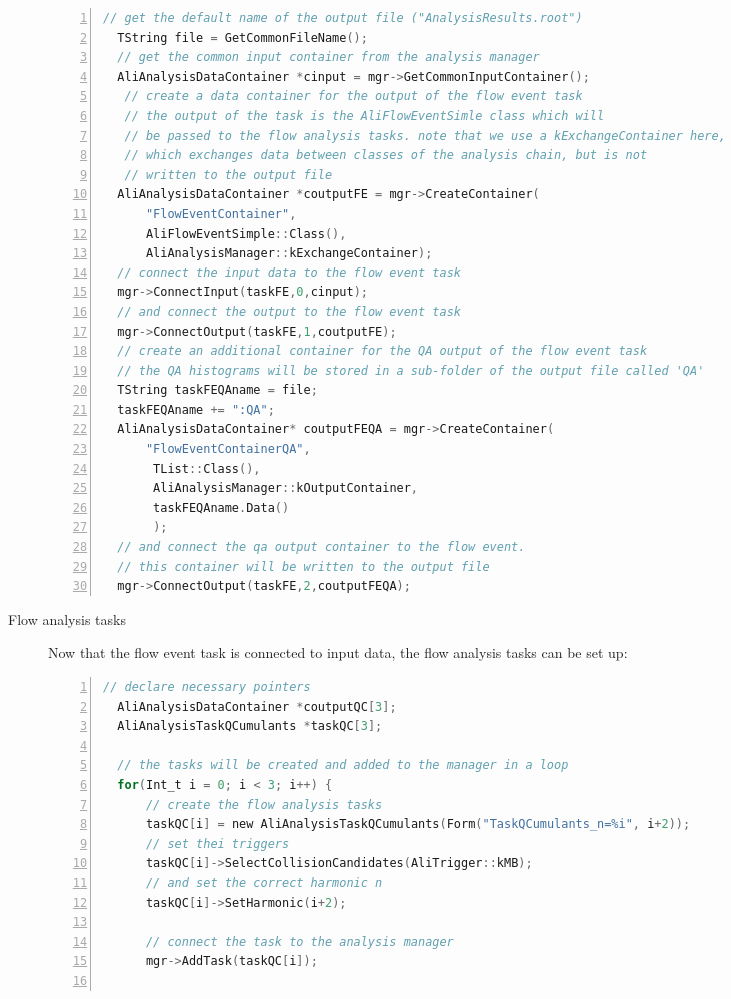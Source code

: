 \documentclass[a4paper]{book}
\numberwithin{equation}{subsection}
\begin{document}
\begin{description}
\begin{lstlisting}[language=C, numbers=left]
  // get the default name of the output file ("AnalysisResults.root")
  TString file = GetCommonFileName();
  // get the common input container from the analysis manager
  AliAnalysisDataContainer *cinput = mgr->GetCommonInputContainer();
   // create a data container for the output of the flow event task  
   // the output of the task is the AliFlowEventSimle class which will
   // be passed to the flow analysis tasks. note that we use a kExchangeContainer here,
   // which exchanges data between classes of the analysis chain, but is not
   // written to the output file
  AliAnalysisDataContainer *coutputFE = mgr->CreateContainer(
      "FlowEventContainer",
      AliFlowEventSimple::Class(),
      AliAnalysisManager::kExchangeContainer);
  // connect the input data to the flow event task
  mgr->ConnectInput(taskFE,0,cinput);
  // and connect the output to the flow event task
  mgr->ConnectOutput(taskFE,1,coutputFE);
  // create an additional container for the QA output of the flow event task
  // the QA histograms will be stored in a sub-folder of the output file called 'QA'
  TString taskFEQAname = file;
  taskFEQAname += ":QA";
  AliAnalysisDataContainer* coutputFEQA = mgr->CreateContainer(
      "FlowEventContainerQA",
       TList::Class(),
       AliAnalysisManager::kOutputContainer,
       taskFEQAname.Data()       
       );
  // and connect the qa output container to the flow event. 
  // this container will be written to the output file
  mgr->ConnectOutput(taskFE,2,coutputFEQA);\end{lstlisting}
  \item [Flow analysis tasks]
Now that the flow event task is connected to input data, the flow analysis tasks can be set up:
\begin{lstlisting}[language=C, numbers=left]
  // declare necessary pointers
  AliAnalysisDataContainer *coutputQC[3];
  AliAnalysisTaskQCumulants *taskQC[3];

  // the tasks will be created and added to the manager in a loop
  for(Int_t i = 0; i < 3; i++) {
      // create the flow analysis tasks
      taskQC[i] = new AliAnalysisTaskQCumulants(Form("TaskQCumulants_n=%i", i+2));
      // set thei triggers 
      taskQC[i]->SelectCollisionCandidates(AliTrigger::kMB);
      // and set the correct harmonic n
      taskQC[i]->SetHarmonic(i+2);

      // connect the task to the analysis manager
      mgr->AddTask(taskQC[i]);


\end{lstlisting}
\end{description}
\end{document}
